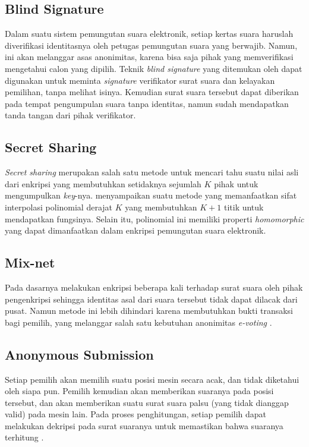 \subsection{Blind Signature}

Dalam suatu sistem pemungutan suara elektronik, setiap kertas suara haruslah diverifikasi identitasnya oleh petugas pemungutan suara yang berwajib. Namun, ini akan melanggar asas anonimitas, karena bisa saja pihak yang memverifikasi mengetahui calon yang dipilih. Teknik \textit{blind signature} yang ditemukan oleh \cite{mixnet} dapat digunakan untuk meminta \textit{signature} verifikator surat suara dan kelayakan pemilihan, tanpa melihat isinya. Kemudian surat suara tersebut dapat diberikan pada tempat pengumpulan suara tanpa identitas, namun sudah mendapatkan tanda tangan dari pihak verifikator.

\subsection{Secret Sharing}

\textit{Secret sharing} merupakan salah satu metode untuk mencari tahu suatu nilai asli dari enkripsi yang membutuhkan setidaknya sejumlah $K$ pihak untuk mengumpulkan \textit{key}-nya. \cite{secretsharing3} menyampaikan suatu metode yang memanfaatkan sifat interpolasi polinomial derajat $K$ yang membutuhkan $K+1$ titik untuk mendapatkan fungsinya. Selain itu, polinomial ini memiliki properti \textit{homomorphic} yang dapat dimanfaatkan dalam enkripsi pemungutan suara elektronik.

\subsection{Mix-net}

Pada dasarnya melakukan enkripsi beberapa kali terhadap surat suara oleh pihak pengenkripsi sehingga identitas asal dari suara tersebut tidak dapat dilacak dari pusat. Namun metode ini lebih dihindari karena membutuhkan bukti transaksi bagi pemilih, yang melanggar salah satu kebutuhan anonimitas \textit{e-voting} \citep{mixnet}.

\subsection{Anonymous Submission}

Setiap pemilih akan memilih suatu posisi mesin secara acak, dan tidak diketahui oleh siapa pun. Pemilih kemudian akan memberikan suaranya pada posisi tersebut, dan akan memberikan suatu surat suara palsu (yang tidak dianggap valid) pada mesin lain. Pada proses penghitungan, setiap pemilih dapat melakukan dekripsi pada surat suaranya untuk memastikan bahwa suaranya terhitung \citep{anonsus}.

